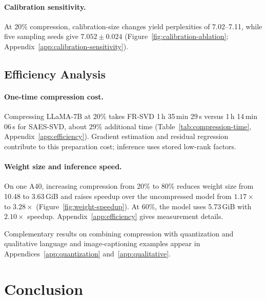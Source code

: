 \documentclass[11pt]{article}
\begin{document}


\paragraph{Calibration sensitivity.}


At $20\%$ compression, calibration-size changes yield perplexities of 7.02--7.11, while five sampling seeds give $7.052\pm0.024$ (Figure~\ref{fig:calibration-ablation}; Appendix~\ref{app:calibration-sensitivity}).

\subsection{Efficiency Analysis}\label{sec:efficiency}

\paragraph{One-time compression cost.}


Compressing LLaMA-7B at 20\% takes FR-SVD 1\,h 35\,min 29\,s versus 1\,h 14\,min 06\,s for SAES-SVD, about 29\% additional time (Table~\ref{tab:compression-time}, Appendix~\ref{app:efficiency}). Gradient estimation and residual regression contribute to this preparation cost; inference uses stored low-rank factors.

\paragraph{Weight size and inference speed.}
On one A40, increasing compression from 20\% to 80\% reduces weight size from 10.48 to 3.63\,GiB and raises speedup over the uncompressed model from $1.17\times$ to $3.28\times$ (Figure~\ref{fig:weight-speedup}). At 60\%, the model uses 5.73\,GiB with $2.10\times$ speedup. Appendix~\ref{app:efficiency} gives measurement details.



Complementary results on combining compression with quantization and qualitative language and image-captioning examples appear in Appendices~\ref{app:quantization} and~\ref{app:qualitative}.

\section{Conclusion}\label{sec:conclusion}
\end{document}
